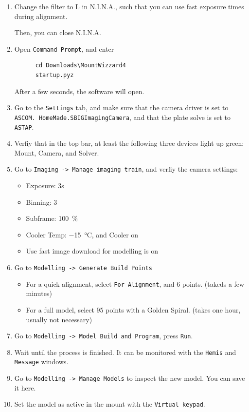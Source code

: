 \documentclass[a4paper, 11pt, fleqn]{memoir}
\begin{document}
\begin{enumerate}
    \item Change the filter to L in N.I.N.A., such that you can use fast exposure times during alignment.
          
          Then, you can close N.I.N.A.
    \item
          Open \texttt{Command Prompt}, and enter
          \begin{verbatim}
      cd Downloads\MountWizzard4
      startup.pyz
  \end{verbatim}
          After a few seconds, the software will open.
    \item
          Go to the \texttt{Settings} tab, and make sure that the camera driver is set to \texttt{ASCOM.
              HomeMade.SBIGImagingCamera}, and that the plate solve is set to \texttt{ASTAP}.
    \item
          Verfiy that in the top bar, at least the following three devices light up green: Mount, Camera, and Solver.
    \item
          Go to \texttt{Imaging -> Manage imaging train}, and verfiy the camera settings:
          \begin{itemize}
              \item
                    Exposure: 3s
              \item
                    Binning: 3
              \item
                    Subframe: \SI{100}{\percent}
              \item
                    Cooler Temp: \SI{-15}{\celsius}, and Cooler on
              \item
                    Use fast image download for modelling is on
          \end{itemize}
    \item
          Go to \texttt{Modelling -> Generate Build Points}
          \begin{itemize}
              \item
                    For a quick alignment, select \texttt{For Alignment}, and 6 points. (takeds a few minutes)
              \item
                    For a full model, select 95 points with a Golden Spiral. (takes one hour, usually not necessary)
          \end{itemize}
    \item
          Go to \texttt{Modelling -> Model Build and Program}, press \texttt{Run}.
    \item
          Wait until the process is finished.
          It can be monitored with the \texttt{Hemis} and \texttt{Message} windows.
    \item
          Go to \texttt{Modelling -> Manage Models} to inspect the new model.
          You can save it here.
    \item
          Set the model as active in the mount with the \texttt{Virtual keypad}.
\end{enumerate}
\end{document}
